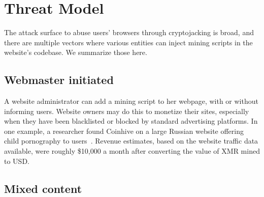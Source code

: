 
%
%
%
%
%
%

\section{Threat Model}

The attack surface to abuse users' browsers through cryptojacking is broad, and there are multiple vectors where various entities can inject mining scripts in the website's codebase. We summarize those here. 

\subsection{Webmaster initiated} 

A website administrator can add a mining script to her webpage, with or without informing users. Website owners may do this to monetize their sites, especially when they have been blacklisted or blocked by standard advertising platforms. In one example, a researcher found Coinhive on a large Russian website offering child pornography to users~\cite{coinhiveonchildporn}. Revenue estimates, based on the website traffic data available, were roughly \$10,000 a month after converting the value of XMR mined to USD.

\subsection{Mixed content} 

